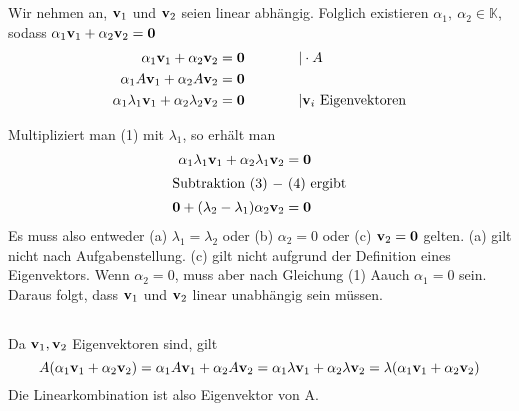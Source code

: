 \documentclass{../mfa}
\begin{document}
\maketitle

\section{}
\subsection{}

\renewcommand{\v}[1]{\mbf{v}_{#1}}
Wir nehmen an, $\mathbf{v}_1$ und $\mathbf{v}_2$ seien linear abhängig. Folglich existieren
$\alpha_1,~\alpha_2 \in \mathbb{K}$, sodass $\alpha_1 \mathbf{v}_1 + \alpha_2 \mathbf{v}_2 = \mathbf{0}$
\begin{align}
   \alpha_1 \mathbf{v}_1 + \alpha_2 \mathbf{v}_2 &= \mathbf{0} & \hspace{1cm} & | \cdot A
   \\
   \alpha_1 A \mathbf{v}_1 + \alpha_2 A \mathbf{v}_2 &= \mathbf{0} \\
   \alpha_1 \lambda_1 \mathbf{v}_1 + \alpha_2 \lambda_2 \mathbf{v}_2 &= \mathbf{0} & & | \mathbf{v}_i~\text{Eigenvektoren}
\end{align}

Multipliziert man (1) mit $\lambda_1$, so erhält man 
\begin{align}
   \alpha_1 \lambda_1 \mathbf{v}_1 + \alpha_2 \lambda_1 \mathbf{v}_2 &= \mathbf{0} \\
   \intertext{Subtraktion (3) $-$ (4) ergibt}
   \mathbf{0} + (\lambda_2 - \lambda_1)\alpha_2 \mathbf{v}_2 &= \mathbf{0}
\end{align}
Es muss also entweder (a) $\lambda_1 = \lambda_2$ oder (b) $\alpha_2 = 0$ oder
(c) $\mathbf{v}_2 = \mathbf{0}$ gelten. (a) gilt nicht nach Aufgabenstellung. (c) gilt nicht aufgrund der
Definition eines Eigenvektors. Wenn $\alpha_2 = 0$, muss aber nach Gleichung (1)
Aauch $\alpha_1 = 0$ sein. Daraus folgt, dass $\mathbf{v}_1$ und $\mathbf{v}_2$ linear unabhängig sein müssen.

\subsection{}

Da $\mathbf{v}_1, \mathbf{v}_2$ Eigenvektoren sind, gilt 
\begin{equation*}
   A(\alpha_1 \v{1} + \alpha_2 \v{2}) = \alpha_1 A \v{1} + \alpha_2 A \v{2} =
   \alpha_1 \lambda \v{1} + \alpha_2 \lambda \v{2} = \lambda (\alpha_1 \v{1} + \alpha_2 \v{2})
\end{equation*}
Die Linearkombination ist also Eigenvektor von A.
\end{document}
